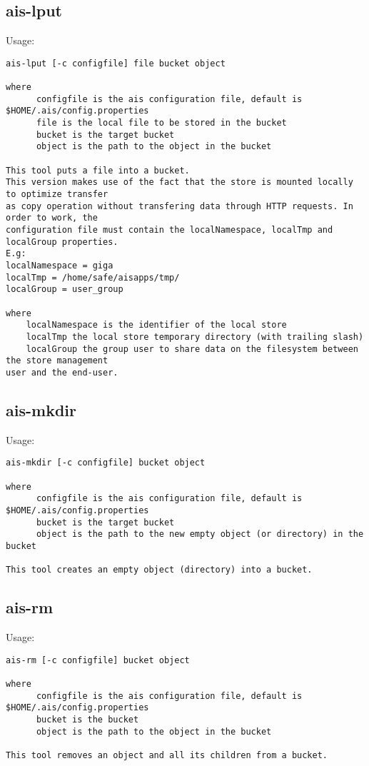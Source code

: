 \documentclass[11pt]{article}
\begin{document}
\subsection{ais-lput}
Usage:\\
\begin{verbatim}
ais-lput [-c configfile] file bucket object

where 
      configfile is the ais configuration file, default is $HOME/.ais/config.properties
      file is the local file to be stored in the bucket
      bucket is the target bucket
      object is the path to the object in the bucket
      
This tool puts a file into a bucket.
This version makes use of the fact that the store is mounted locally to optimize transfer
as copy operation without transfering data through HTTP requests. In order to work, the
configuration file must contain the localNamespace, localTmp and localGroup properties.
E.g:
localNamespace = giga
localTmp = /home/safe/aisapps/tmp/
localGroup = user_group

where
    localNamespace is the identifier of the local store
    localTmp the local store temporary directory (with trailing slash)
    localGroup the group user to share data on the filesystem between the store management
user and the end-user.

\end{verbatim}

\subsection{ais-mkdir}
Usage:\\
\begin{verbatim}
ais-mkdir [-c configfile] bucket object

where 
      configfile is the ais configuration file, default is $HOME/.ais/config.properties
      bucket is the target bucket
      object is the path to the new empty object (or directory) in the bucket
      
This tool creates an empty object (directory) into a bucket.
\end{verbatim}
\subsection{ais-rm}
Usage:\\
\begin{verbatim}
ais-rm [-c configfile] bucket object

where 
      configfile is the ais configuration file, default is $HOME/.ais/config.properties
      bucket is the bucket
      object is the path to the object in the bucket
      
This tool removes an object and all its children from a bucket.
\end{verbatim}
\end{document}
